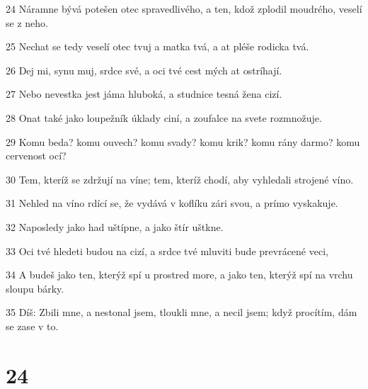 \par 24 Náramne bývá potešen otec spravedlivého, a ten, kdož zplodil moudrého, veselí se z neho.
\par 25 Nechat se tedy veselí otec tvuj a matka tvá, a at pléše rodicka tvá.
\par 26 Dej mi, synu muj, srdce své, a oci tvé cest mých at ostríhají.
\par 27 Nebo nevestka jest jáma hluboká, a studnice tesná žena cizí.
\par 28 Onat také jako loupežník úklady ciní, a zoufalce na svete rozmnožuje.
\par 29 Komu beda? komu ouvech? komu svady? komu krik? komu rány darmo? komu cervenost ocí?
\par 30 Tem, kteríž se zdržují na víne; tem, kteríž chodí, aby vyhledali strojené víno.
\par 31 Nehled na víno rdící se, že vydává v koflíku zári svou, a prímo vyskakuje.
\par 32 Naposledy jako had uštípne, a jako štír uštkne.
\par 33 Oci tvé hledeti budou na cizí, a srdce tvé mluviti bude prevrácené veci,
\par 34 A budeš jako ten, kterýž spí u prostred more, a jako ten, kterýž spí na vrchu sloupu bárky.
\par 35 Díš: Zbili mne, a nestonal jsem, tloukli mne, a necil jsem; když procítím, dám se zase v to.

\chapter{24}

